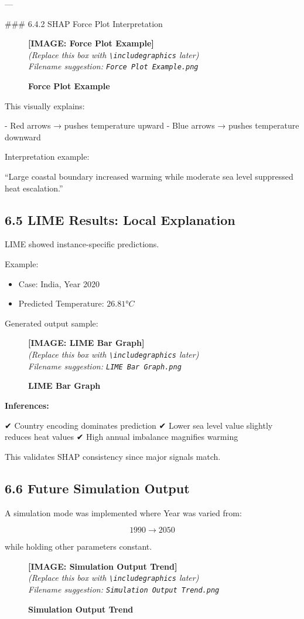 \documentclass[12pt, a4paper]{article}
\newcommand{\imageplaceholder}[2]{
  \begin{figure}[H]
    \centering
    \begin{tcolorbox}[colback=white, colframe=black, width=0.8\textwidth, arc=0mm, boxrule=1pt]
      \centering
      \vspace{#2}
      \textbf{\Large [IMAGE: #1]}\\
      \vspace{0.5cm}
      \textit{(Replace this box with \texttt{\textbackslash includegraphics} later)}\\
      \textit{Filename suggestion: \texttt{#1.png}}
      \vspace{#2}
    \end{tcolorbox}
    \caption{\textbf{#1}}
    \label{fig:#1}
  \end{figure}
}
\begin{document}
---

### 6.4.2 SHAP Force Plot Interpretation

\imageplaceholder{Force Plot Example}{6cm}

This visually explains:

- Red arrows → pushes temperature upward
- Blue arrows → pushes temperature downward

Interpretation example:

“Large coastal boundary increased warming while moderate sea level suppressed heat escalation.”


\subsection{\textbf{6.5 LIME Results: Local Explanation}}

LIME showed instance-specific predictions.

Example:

\begin{itemize}
    \item Case: India, Year 2020
    \item Predicted Temperature: \(26.81°C\)
\end{itemize}

Generated output sample:


\imageplaceholder{LIME Bar Graph}{5cm}

\textbf{Inferences:}

✔ Country encoding dominates prediction  
✔ Lower sea level value slightly reduces heat values  
✔ High annual imbalance magnifies warming  

This validates SHAP consistency since major signals match.


\subsection{\textbf{6.6 Future Simulation Output}}

A simulation mode was implemented where Year was varied from:

\[
1990 \rightarrow 2050
\]

while holding other parameters constant.

\imageplaceholder{Simulation Output Trend}{6cm}
\end{document}
